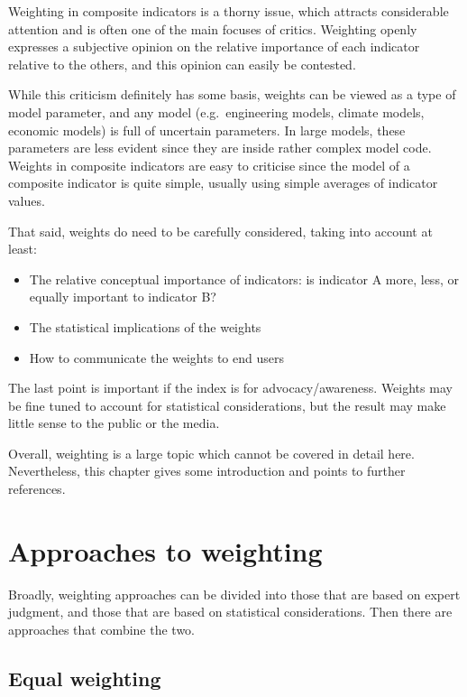 \documentclass[
]{book}
\providecommand{\tightlist}{%
  \setlength{\itemsep}{0pt}\setlength{\parskip}{0pt}}
\begin{document}
Weighting in composite indicators is a thorny issue, which attracts considerable attention and is often one of the main focuses of critics. Weighting openly expresses a subjective opinion on the relative importance of each indicator relative to the others, and this opinion can easily be contested.

While this criticism definitely has some basis, weights can be viewed as a type of model parameter, and any model (e.g.~engineering models, climate models, economic models) is full of uncertain parameters. In large models, these parameters are less evident since they are inside rather complex model code. Weights in composite indicators are easy to criticise since the model of a composite indicator is quite simple, usually using simple averages of indicator values.

That said, weights do need to be carefully considered, taking into account at least:

\begin{itemize}
\tightlist
\item
  The relative conceptual importance of indicators: is indicator A more, less, or equally important to indicator B?
\item
  The statistical implications of the weights
\item
  How to communicate the weights to end users
\end{itemize}

The last point is important if the index is for advocacy/awareness. Weights may be fine tuned to account for statistical considerations, but the result may make little sense to the public or the media.

Overall, weighting is a large topic which cannot be covered in detail here. Nevertheless, this chapter gives some introduction and points to further references.

\hypertarget{approaches-to-weighting}{%
\section{Approaches to weighting}\label{approaches-to-weighting}}

Broadly, weighting approaches can be divided into those that are based on expert judgment, and those that are based on statistical considerations. Then there are approaches that combine the two.

\hypertarget{equal-weighting}{%
\subsection{Equal weighting}\label{equal-weighting}}
\end{document}
